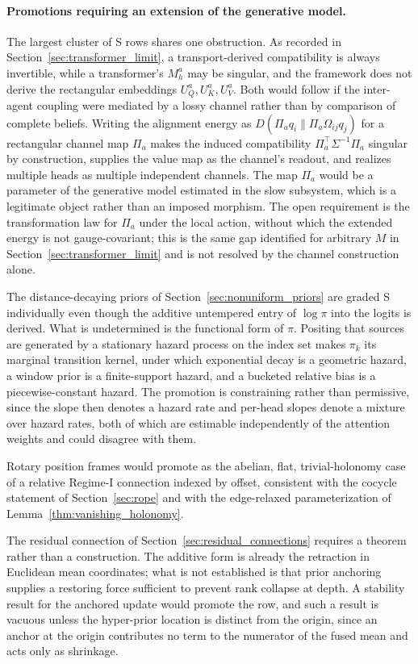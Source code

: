 \documentclass[twoside,11pt]{article}
\begin{document}
\paragraph{Promotions requiring an extension of the generative model.}
The largest cluster of S rows shares one obstruction. As recorded in Section~\ref{sec:transformer_limit}, a transport-derived compatibility is always invertible, while a transformer's $M_h^a$ may be singular, and the framework does not derive the rectangular embeddings $U_Q^a, U_K^a, U_V^a$. Both would follow if the inter-agent coupling were mediated by a lossy channel rather than by comparison of complete beliefs. Writing the alignment energy as $D(\Pi_a q_i \| \Pi_a \Omega_{ij} q_j)$ for a rectangular channel map $\Pi_a$ makes the induced compatibility $\Pi_a^\top \Sigma^{-1} \Pi_a$ singular by construction, supplies the value map as the channel's readout, and realizes multiple heads as multiple independent channels. The map $\Pi_a$ would be a parameter of the generative model estimated in the slow subsystem, which is a legitimate object rather than an imposed morphism. The open requirement is the transformation law for $\Pi_a$ under the local action, without which the extended energy is not gauge-covariant; this is the same gap identified for arbitrary $M$ in Section~\ref{sec:transformer_limit} and is not resolved by the channel construction alone.

The distance-decaying priors of Section~\ref{sec:nonuniform_priors} are graded S individually even though the additive untempered entry of $\log \pi$ into the logits is derived. What is undetermined is the functional form of $\pi$. Positing that sources are generated by a stationary hazard process on the index set makes $\pi_k$ its marginal transition kernel, under which exponential decay is a geometric hazard, a window prior is a finite-support hazard, and a bucketed relative bias is a piecewise-constant hazard. The promotion is constraining rather than permissive, since the slope then denotes a hazard rate and per-head slopes denote a mixture over hazard rates, both of which are estimable independently of the attention weights and could disagree with them.

Rotary position frames would promote as the abelian, flat, trivial-holonomy case of a relative Regime-I connection indexed by offset, consistent with the cocycle statement of Section~\ref{sec:rope} and with the edge-relaxed parameterization of Lemma~\ref{thm:vanishing_holonomy}.

The residual connection of Section~\ref{sec:residual_connections} requires a theorem rather than a construction. The additive form is already the retraction in Euclidean mean coordinates; what is not established is that prior anchoring supplies a restoring force sufficient to prevent rank collapse at depth. A stability result for the anchored update would promote the row, and such a result is vacuous unless the hyper-prior location is distinct from the origin, since an anchor at the origin contributes no term to the numerator of the fused mean and acts only as shrinkage.
\end{document}
